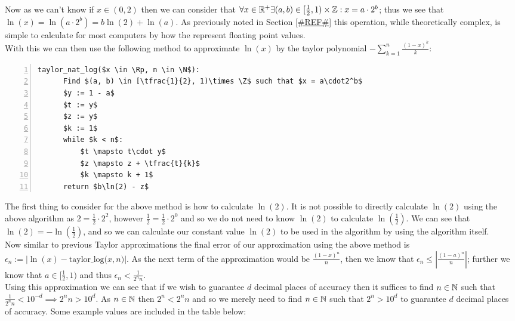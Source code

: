 Now as we can't know if \(x \in (0,2)\) then we can consider that \(\forall x \in \mathbb{R}^+ \exists (a, b) \in [\frac{1}{2}, 1)\times\mathbb{Z} : x = a\cdot2^b\); thus we see that \(\ln(x) = \ln(a\cdot2^b) = b\ln(2) + \ln(a)\). As previously noted in Section \ref{#REF#} this operation, while theoretically complex, is simple to calculate for most computers by how the represent floating point values.\\

With this we can then use the following method to approximate \(\ln(x)\) by the taylor polynomial \(-\sum_{k=1}^n\frac{(1-x)^k}{k}\):

\begin{lstlisting}[numbers=left,frame=single,mathescape,caption={Taylor Method for calculating \(\ln(x)\)},label={PCD_"taylor log"}]
  taylor_nat_log($x \in \Rp, n \in \N$):
      Find $(a, b) \in [\tfrac{1}{2}, 1)\times \Z$ such that $x = a\cdot2^b$
      $y := 1 - a$
      $t := y$
      $z := y$
      $k := 1$
      while $k < n$:
          $t \mapsto t\cdot y$
          $z \mapsto z + \tfrac{t}{k}$
          $k \mapsto k + 1$
      return $b\ln(2) - z$
\end{lstlisting}

The first thing to consider for the above method is how to calculate \(\ln(2)\). It is not possible to directly calculate \(\ln(2)\) using the above algorithm as \(2 = \frac{1}{2}\cdot2^2\), however \(\frac{1}{2} = \frac{1}{2}\cdot2^0\) and so we do not need to know \(\ln(2)\) to calculate \(\ln(\frac{1}{2})\). We can see that \(\ln(2) = -\ln(\frac{1}{2})\), and so we can calculate our constant value \(\ln(2)\) to be used in the algorithm by using the algorithm itself.\\

Now similar to previous Taylor approximations the final error of our approximation using the above method is \(\epsilon_n := |\ln(x) - \textrm{taylor\_log(}x,n\textrm{)}|\). As the next term of the approximation would be \(\tfrac{(1-x)^n}{n}\), then we know that \(\epsilon_n \le \left|\tfrac{(1-a)^n}{n}\right|\); further we know that \(a \in [\tfrac{1}{2}, 1)\) and thus \(\epsilon_n < \tfrac{1}{2^nn}\).\\

Using this approximation we can see that if we wish to guarantee \(d\) decimal places of accuracy then it suffices to find \(n \in \mathbb{N}\) such that \(\tfrac{1}{2^nn} < 10^{-d} \implies 2^nn > 10^d\). As \(n \in \mathbb{N}\) then \(2^n < 2^nn\) and so we merely need to find \(n \in \mathbb{N}\) such that \(2^n > 10^d\) to guarantee \(d\) decimal places of accuracy. Some example values are included in the table below:\\

